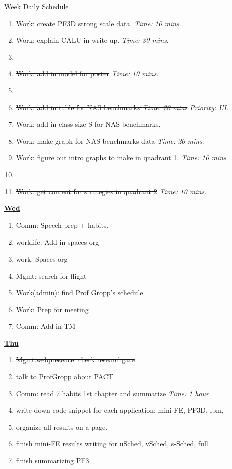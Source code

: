 \documentclass[serif, mathserif, final]{beamer}
\newcommand{\doneTask}[1]{\item \sout{#1}}
\newcommand{\timeEst}[1]{\textit{Time:} \textit{#1}}
\newcommand{\priority}[1]{\textit{Priority:} \textit{#1}}
\begin{document}
\begin{frame}{}
\begin{columns}
\begin{column}{0.50\linewidth}
\begin{block}{Week Daily Schedule}
\begin{enumerate}
\item \tiny Work: create PF3D strong scale data. \timeEst{10 mins}. 
\item \tiny Work: explain CALU in write-up. \timeEst{30 mins}. 
\item \tiny \doneTask{Work: add in model for poster} \timeEst{10 mins}. 
\item \tiny \doneTask{Work: add in table for NAS benchmarks \timeEst{20 mins}} \priority{UI}. 
\item \tiny Work: add in class size S for NAS benchmarks. 
\item \tiny Work: make graph for NAS benchmarks data \timeEst{20 mins}. 
\item \tiny Work: figure out intro graphs to make in quadrant 1.  \timeEst{10 mins} 
\item \tiny \doneTask{Work: get content for strategies in quadrant 2}  \timeEst{10 mins}. 
\end{enumerate} 

\textbf{\small {\underline{Wed}}}
\begin{enumerate} 
\tiny \item \tiny Comm: Speech prep + habits. 
\item \tiny worklife: Add in spaces org 
\item \tiny work: Spaces org
\item \tiny Mgmt: search for flight 
\item \tiny Work(admin): find Prof Gropp's schedule 
\item \tiny Work: Prep for meeting 
\item \tiny Comm: Add in TM  
\end{enumerate} 

\textbf{\small{\underline{Thu}}}
\begin{enumerate} 
\tiny \doneTask{Mgmt:webpresence: check researchgate}
\item \tiny talk to ProfGropp about PACT
\item \tiny Comm: read 7 habits 1st chapter and summarize \timeEst{1 hour} . 

\item \tiny write down code snippet for each application: mini-FE, PF3D, lbm, 
\item \tiny organize all results on a page. 
\item \tiny finish mini-FE results writing for uSched, vSched, s-Sched, full 
\item \tiny finish summarizing PF3
\end{enumerate}


\end{block}
\end{column}
\end{columns}
\end{frame}
\end{document}
